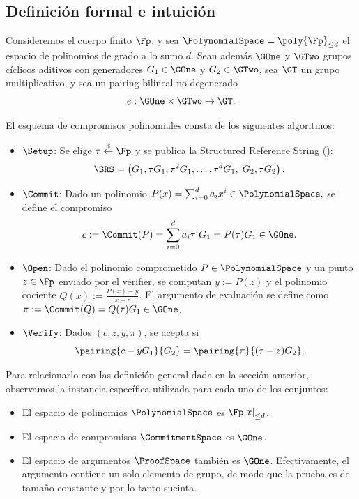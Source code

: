 
\subsection{Definición formal e intuición}

\begin{definition}[\KZG \PCS]
	Consideremos el cuerpo finito $\Fp$, y sea $\PolynomialSpace = \poly{\Fp}_{\leq d}$ el espacio de polinomios de grado a lo sumo $d$. Sean además $\GOne$ y $\GTwo$ grupos cíclicos aditivos con generadores $G_1 \in \GOne$ y $G_2 \in \GTwo$, sea $\GT$ un grupo multiplicativo, y sea un pairing bilineal no degenerado
	$$
	e : \GOne \times \GTwo \to \GT.
	$$
	
	El esquema de compromisos polinomiales \KZG consta de los siguientes algoritmos:
	
	\begin{itemize}
		\item $\Setup$: Se elige $\tau \overset{\$}{\leftarrow}  \Fp$ y se publica la Structured Reference String (\SRS):
		$$\SRS = \left(G_1, \tau G_1, \tau^2 G_1, \ldots, \tau^d G_1,\; G_2, \tau G_2 \right).$$
		\item $\Commit$: Dado un polinomio $P(x) = \sum_{i=0}^{d} a_i x^i \in \PolynomialSpace,$
		se define el compromiso
		$$c := \Commit(P) = \sum_{i=0}^{d} a_i \tau^i G_1 = P(\tau) G_1 \in \GOne.$$
		
		\item $\Open$: Dado el polinomio comprometido $P \in \PolynomialSpace$ y un punto $z \in  \Fp$ enviado por el verifier, se computan $y := P(z)$ y el polinomio cociente $Q(x) := \frac{P(x) - y}{x - z}$. El argumento de evaluación se define como
		$\pi := \Commit(Q) = Q(\tau) G_1 \in \GOne$.
		
		\item $\Verify$: Dados $(c, z, y, \pi)$, se acepta si
		$$\pairing{c - yG_1}{G_2} = \pairing{\pi}{(\tau - z)G_2}.$$
	\end{itemize}
\end{definition}

Para relacionarlo con las definición general dada en la sección anterior, observamos la instancia específica utilizada para cada uno de los conjuntos:
	\begin{itemize}[itemsep=0.1cm]
		\item El espacio de polinomios $\PolynomialSpace$ es $ \Fp[x]_{\leq d}$.
		\item El espacio de compromisos $\CommitmentSpace$ es $\GOne$.
		\item El espacio de argumentos $\ProofSpace$ también es $\GOne$. Efectivamente, el argumento contiene un solo elemento de grupo, de modo que la prueba es de tamaño constante y por lo tanto sucinta.
	\end{itemize}

